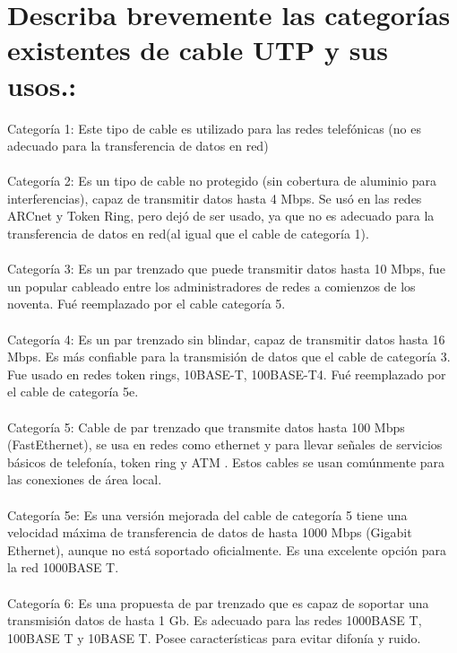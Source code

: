 \documentclass{article}
\begin{document}
\section{Describa brevemente las categorías existentes de cable UTP y sus usos.:}

Categoría 1: Este tipo de cable es utilizado para las redes telefónicas (no es adecuado para la transferencia de datos en red)\\\\

Categoría 2: Es un tipo de cable no protegido (sin cobertura de aluminio para interferencias), capaz de transmitir datos hasta 4 Mbps. Se usó en las redes ARCnet y Token Ring, pero dejó de ser usado, ya que no es adecuado para la transferencia de datos en red(al igual que el cable de categoría 1).\\\\

Categoría 3: Es un par trenzado que puede transmitir datos hasta 10 Mbps, fue un popular cableado entre los administradores de redes a comienzos de los noventa. Fué reemplazado por el cable categoría 5.\\\\

Categoría 4: Es un par trenzado sin blindar, capaz de transmitir datos hasta 16 Mbps. Es más confiable para la transmisión de datos que el cable de categoría 3. Fue usado en redes token rings, 10BASE-T, 100BASE-T4. Fué reemplazado por el cable de categoría 5e.\\\\

Categoría 5: Cable de par trenzado que transmite datos hasta 100 Mbps (FastEthernet), se usa en redes como ethernet y para llevar señales de servicios básicos de telefonía, token ring y ATM . Estos cables se usan comúnmente para las conexiones de área local.\\\\

Categoría 5e: Es una versión mejorada del cable de categoría 5 tiene una velocidad máxima de transferencia de datos de hasta 1000 Mbps (Gigabit Ethernet), aunque no está soportado oficialmente. Es una excelente opción para la red 1000BASE T.\\\\

Categoría 6: Es una propuesta de par trenzado que es capaz de soportar una transmisión datos de hasta 1 Gb. Es adecuado para las redes 1000BASE T, 100BASE T y 10BASE T. Posee características para evitar difonía y ruido.\\\\
\end{document}
